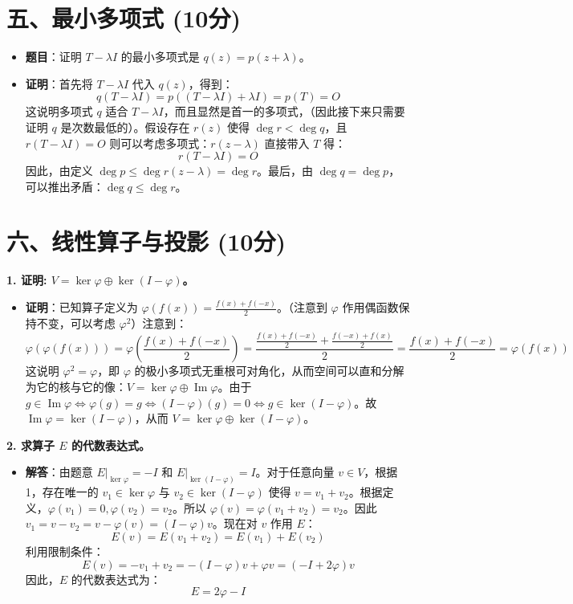 \documentclass[12pt,a4paper]{article}
\DeclareMathOperator{\Img}{Im}
\begin{document}
\section*{五、最小多项式 (10分)}

\begin{itemize}
    \item \textbf{题目}：证明 $T - \lambda I$ 的最小多项式是 $q(z) = p(z + \lambda)$。
    \item \textbf{证明}：首先将 $T - \lambda I$ 代入 $q(z)$，得到：
    $$ q(T - \lambda I) = p((T - \lambda I) + \lambda I) = p(T) = O $$
    这说明多项式 $q$ 适合 $T - \lambda I$，而且显然是首一的多项式，（因此接下来只需要证明 $q$ 是次数最低的）。假设存在 $r(z)$ 使得 $\deg r < \deg q$，且 $r(T - \lambda I) = O$ 则可以考虑多项式：$r(z - \lambda)$ 直接带入 $T$ 得：
    $$ r(T - \lambda I) = O $$
    因此，由定义 $\deg p \le \deg r(z - \lambda) = \deg r$。最后，由 $\deg q = \deg p$，可以推出矛盾：$\deg q \le \deg r$。
\end{itemize}


\section*{六、线性算子与投影 (10分)}

\textbf{1. 证明: $V = \ker\varphi \oplus \ker(I - \varphi)$。}
\begin{itemize}
    \item \textbf{证明}：已知算子定义为 $\varphi(f(x)) = \frac{f(x)+f(-x)}{2}$。（注意到 $\varphi$ 作用偶函数保持不变，可以考虑 $\varphi^2$）注意到：
    $$ \varphi(\varphi(f(x))) = \varphi\left(\frac{f(x)+f(-x)}{2}\right) = \frac{\frac{f(x)+f(-x)}{2} + \frac{f(-x)+f(x)}{2}}{2} = \frac{f(x)+f(-x)}{2} = \varphi(f(x)) $$
    这说明 $\varphi^2 = \varphi$，即 $\varphi$ 的极小多项式无重根可对角化，从而空间可以直和分解为它的核与它的像：$V = \ker\varphi \oplus \Img\varphi$。由于 $g \in \Img\varphi \iff \varphi(g)=g \iff (I-\varphi)(g)=0 \iff g \in \ker(I-\varphi)$。故 $\Img\varphi = \ker(I-\varphi)$，从而 $V = \ker\varphi \oplus \ker(I-\varphi)$。
\end{itemize}

\textbf{2. 求算子 $E$ 的代数表达式。}
\begin{itemize}
    \item \textbf{解答}：由题意 $E|_{\ker\varphi} = -I$ 和 $E|_{\ker(I-\varphi)} = I$。对于任意向量 $v \in V$，根据 1，存在唯一的 $v_1 \in \ker\varphi$ 与 $v_2 \in \ker(I-\varphi)$ 使得 $v = v_1 + v_2$。根据定义，$\varphi(v_1) = 0, \varphi(v_2) = v_2$。所以 $\varphi(v) = \varphi(v_1 + v_2) = v_2$。因此 $v_1 = v - v_2 = v - \varphi(v) = (I - \varphi)v$。现在对 $v$ 作用 $E$：
    $$ E(v) = E(v_1 + v_2) = E(v_1) + E(v_2) $$
    利用限制条件：
    $$ E(v) = -v_1 + v_2 = -(I - \varphi)v + \varphi v = (-I + 2\varphi)v $$
    因此，$E$ 的代数表达式为：
    $$ E = 2\varphi - I $$
\end{itemize}
\end{document}

